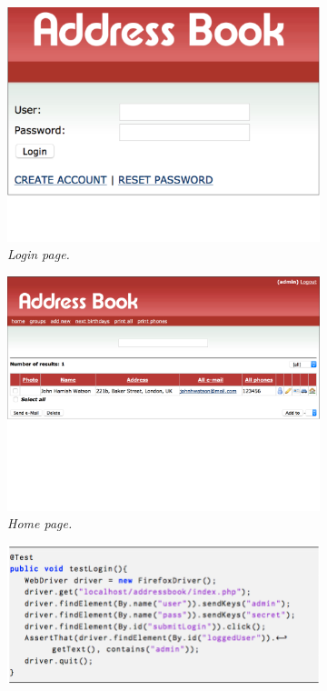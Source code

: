 \begin{figure}[t]
\centering
\begin{subfigure}{.20\linewidth}
\centering
\includegraphics[trim=0cm 5.3cm 0.1cm 0.1cm, clip=true, scale=0.107]{images/ab1.pdf}
\caption{\emph{Login page.}}
\label{fig:ab-back-a} 
\end{subfigure}
\quad
\begin{subfigure}{.25\linewidth}
\centering
\includegraphics[trim=0cm 10.5cm 0cm 0cm, clip=true, scale=0.141]{images/ab2.pdf}
\caption{\emph{Home page.}}
\label{fig:ab-back-b} 
\end{subfigure}
\qquad
\begin{subfigure}{.25\linewidth}
\centering
\includegraphics[trim=0cm 0cm 2cm 0cm, clip=true, scale=0.22]{images/test.png}

\end{subfigure}
\end{figure}
